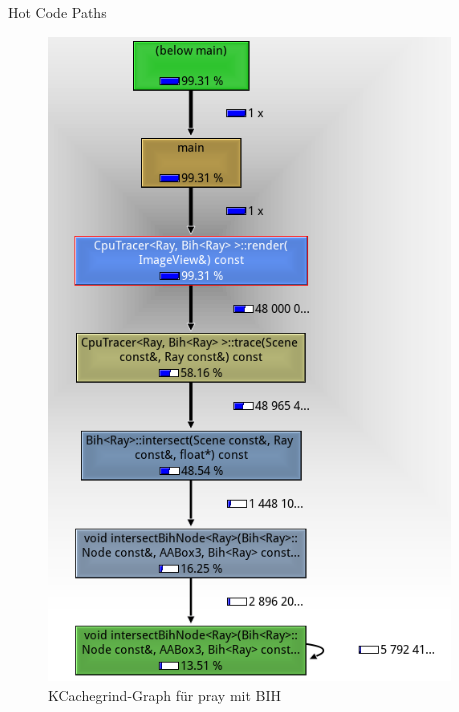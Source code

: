 	\begin{frame}{Hot Code Paths}
		\begin{figure}[ht]
			\begin{columns}
				\begin{column}{.48\textwidth}
					\center
					\includegraphics[height=.7\textheight]{images/callgrind_bih.png}
					\caption{KCachegrind-Graph für pray mit BIH}
				\end{column}
				\begin{column}{.48\textwidth}

\end{column}
\end{columns}
\end{figure}
\end{frame}
